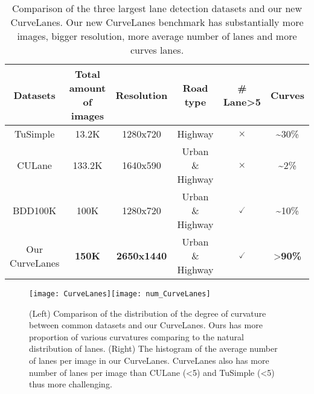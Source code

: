 \documentclass[runningheads]{llncs}
\providecommand{\tabularnewline}{\\}
\begin{document}
\begin{table}[tb]
\caption{\label{tab:Comparsion-of-three-dataset}Comparison of the three largest
lane detection datasets and our new CurveLanes. Our new CurveLanes
benchmark has substantially more images, bigger resolution, more average
number of lanes and more curves lanes.}



\begin{centering}
\tabcolsep 0.02in{\footnotesize{}}\begin{tabular}{cccccc}
\hline 
{\scriptsize{}Datasets} & {\scriptsize{}Total amount of images} & {\scriptsize{}Resolution} & {\scriptsize{}Road type} & {\scriptsize{}\# Lane\textgreater 5} & {\scriptsize{}Curves}\tabularnewline
\hline 
{\scriptsize{}TuSimple \cite{TuSimple}} & {\scriptsize{}13.2K} & {\scriptsize{}1280x720} & {\scriptsize{}Highway} & {\scriptsize{}$\times$} & {\scriptsize{}\textasciitilde 30\%}\tabularnewline
{\scriptsize{}CULane \cite{pan2018spatial}} & {\scriptsize{}133.2K} & {\scriptsize{}1640x590} & {\scriptsize{}Urban \& Highway} & {\scriptsize{}$\times$} & {\scriptsize{}\textasciitilde 2\%}\tabularnewline
{\scriptsize{}BDD100K \cite{yu2018bdd100k}} & {\scriptsize{}100K} & {\scriptsize{}1280x720} & {\scriptsize{}Urban \& Highway} & \textbf{\scriptsize{}$\checked$} & {\scriptsize{}\textasciitilde 10\%}\tabularnewline
{\scriptsize{}Our CurveLanes} & \textbf{\scriptsize{}150K} & \textbf{\scriptsize{}2650x1440} & {\scriptsize{}Urban \& Highway} & \textbf{\scriptsize{}$\checked$} & {\scriptsize{}\textgreater}\textbf{\scriptsize{}90\%}\tabularnewline
\hline 
\end{tabular}{\footnotesize\par}
\par\end{centering}

\end{table}

\begin{figure}[tb]


\begin{centering}
\texttt{[image: CurveLanes]}\texttt{[image: num\_CurveLanes]}
\par\end{centering}


\caption{\label{fig:Examples-of-CurveLanes-1}(Left) Comparison of the distribution
of the degree of curvature between common datasets and our CurveLanes.
Ours has more proportion of various curvatures comparing to the natural
distribution of lanes. (Right) The histogram of the average number
of lanes per image in our CurveLanes. CurveLanes also has more number
of lanes per image than CULane (\textless 5) and TuSimple (\textless 5)
thus more challenging.}


\end{figure}
\end{document}
